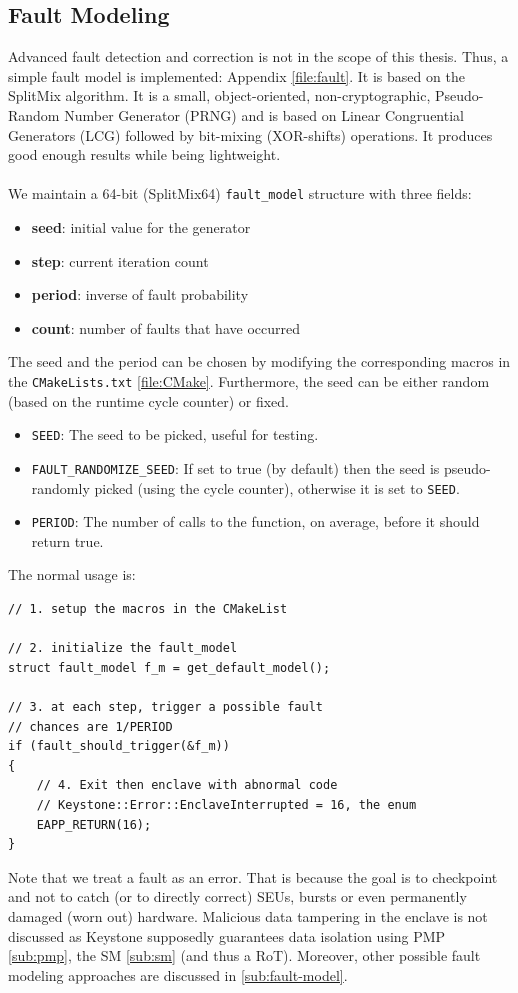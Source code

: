 \documentclass[11pt,a4paper]{report}
\begin{document}
\subsection{Fault Modeling}
Advanced fault detection and correction is not in the scope of this thesis.
Thus, a simple fault model is implemented: Appendix \ref{file:fault}. It is based on the SplitMix \cite{splitmix,splitmix1} algorithm. 
It is a small, object-oriented, non-cryptographic, Pseudo-Random Number Generator (PRNG) and is based on Linear Congruential Generators (LCG) followed by bit-mixing (XOR-shifts) operations. 
It produces good enough results while being lightweight. 
\\\\
We maintain a 64-bit (SplitMix64) \verb|fault_model| structure with three fields:
\begin{itemize}
    \item \textbf{seed}: initial value for the generator
    \item \textbf{step}: current iteration count
    \item \textbf{period}: inverse of fault probability
    \item \textbf{count}: number of faults that have occurred
\end{itemize}
The seed and the period can be chosen by modifying the corresponding macros in the \verb|CMakeLists.txt| \ref{file:CMake}.
Furthermore, the seed can be either random (based on the runtime cycle counter) or fixed.
\begin{itemize}
    \item \verb|SEED|: The seed to be picked, useful for testing.
    \item \verb|FAULT_RANDOMIZE_SEED|: If set to true (by default) then the seed is pseudo-randomly picked (using the cycle counter), otherwise it is set to \verb|SEED|.
    \item \verb|PERIOD|: The number of calls to the function, on average, before it should return true.
\end{itemize}
The normal usage is: 
\begin{verbatim}
// 1. setup the macros in the CMakeList

// 2. initialize the fault_model
struct fault_model f_m = get_default_model();

// 3. at each step, trigger a possible fault
// chances are 1/PERIOD
if (fault_should_trigger(&f_m)) 
{
    // 4. Exit then enclave with abnormal code
    // Keystone::Error::EnclaveInterrupted = 16, the enum
    EAPP_RETURN(16);
}
\end{verbatim}
Note that we treat a fault as an error. 
That is because the goal is to checkpoint and not to catch (or to directly correct) SEUs, bursts or even permanently damaged (worn out) hardware.
Malicious data tampering in the enclave is not discussed as Keystone supposedly guarantees data isolation using PMP \ref{sub:pmp}, the SM \ref{sub:sm} (and thus a RoT).   
Moreover, other possible fault modeling approaches are discussed in \ref{sub:fault-model}.
\end{document}
